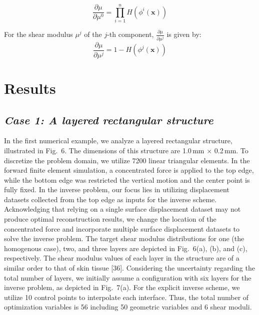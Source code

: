 \documentclass[11pt]{article}
\begin{document}
\begin{equation}
\frac{\partial\mu}{\partial\mu^{0}}
= \prod_{i=1}^{n} H\!\left(\phi^{i}(\mathbf{x})\right)
\end{equation}

For the shear modulus $\mu^{j}$ of the $j$-th component,
$\frac{\partial\mu}{\partial\mu^{j}}$ is given by:
\begin{equation}
\frac{\partial\mu}{\partial\mu^{j}}
= 1 - H\!\left(\phi^{j}(\mathbf{x})\right)
\end{equation}

\section*{Results}

\subsection*{\textit{Case 1: A layered rectangular structure}}

\noindent
In the first numerical example, we analyze a layered rectangular
structure, illustrated in Fig.~6. The dimensions of this structure
are 1.0\,mm $\times$ 0.2\,mm. To discretize the problem domain, we
utilize 7200 linear triangular elements. In the forward finite
element simulation, a concentrated force is applied to the top edge,
while the bottom edge was restricted the vertical motion and the
center point is fully fixed. In the inverse problem, our focus lies
in utilizing displacement datasets collected from the top edge as
inputs for the inverse scheme. Acknowledging that relying on a single
surface displacement dataset may not produce optimal reconstruction
results, we change the location of the concentrated force and
incorporate multiple surface displacement datasets to solve the
inverse problem. The target shear modulus distributions for one (the
homogenous case), two, and three layers are depicted in Fig.~6(a),
(b), and (c), respectively. The shear modulus values of each layer in
the structure are of a similar order to that of skin tissue [36].
Considering the uncertainty regarding the total number of layers, we
initially assume a configuration with six layers for the inverse
problem, as depicted in Fig.~7(a). For the explicit inverse scheme,
we utilize 10 control points to interpolate each interface. Thus, the
total number of optimization variables is 56 including 50 geometric
variables and 6 shear moduli.
\end{document}
